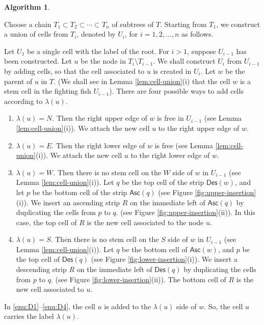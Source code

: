 \documentclass[a4paper,11pt,reqno]{amsart}
\theoremstyle{definition}
\newtheorem{algo}{Algorithm}
\renewcommand{\thealgo}{\Alph{algo}}
\numberwithin{equation}{section}
\newcommand{\Des}{{\textsf{Des}}}
\newcommand{\Asc}{{\textsf{Asc}}}
\begin{document}
\begin{algo} \label{algo:tree-to-fish}
\leavevmode

Choose a chain $T_1\subset T_2\subset\cdots\subset T_n$ of subtrees of $T$. Starting from $T_1$, we construct a union of cells from  $T_i$, denoted by $U_i$,  for $i=1,2,\dots,n$ as follows.

Let $U_1$ be a single cell with the label of the root. For $i>1$, suppose $U_{i-1}$ has been constructed. Let $u$ be the node in $T_i\setminus T_{i-1}$. We shall construct $U_i$ from $U_{i-1}$ by adding cells, so that the cell associated to $u$ is created in $U_i$. Let $w$ be the parent of $u$ in $T$. (We shall see in Lemma \ref{lem:cell-union}(i) that the cell $w$ is a stem cell in the fighting fish $U_{i-1}$). There are four possible ways to add cells according to $\lambda(u)$.


\begin{enumerate}[label=(\thealgo\arabic*), ref=(\thealgo\arabic*)]
\item $\lambda(u)=N$. Then the right upper edge of $w$ is free in $U_{i-1}$ (see Lemma \ref{lem:cell-union}(i)). We attach the new cell $u$ to the right upper edge of $w$. \label{enu:D1}
\item $\lambda(u)=E$.  Then the right lower edge of $w$ is free (see Lemma \ref{lem:cell-union}(i)). We attach the new cell $u$ to the right lower edge of $w$. \label{enu:D2}
\item $\lambda(u)=W$.  Then there is no stem cell on the $W$ side of $w$ in $U_{i-1}$ (see Lemma \ref{lem:cell-union}(i)).
Let $q$ be the top cell of the strip $\Des(w)$, and let $p$ be the bottom cell of the strip $\Asc(q)$ (see Figure \ref{fig:upper-insertion}(i)). 
We insert an ascending strip $R$ on the immediate left of $\Asc(q)$ by duplicating the cells from $p$ to $q$. (see Figure \ref{fig:upper-insertion}(ii)). In this case, the top cell of $R$ is the new cell associated to the node $u$. \label{enu:D3}
\item $\lambda(u)=S$.  Then there is no stem cell on the $S$ side of $w$ in $U_{i-1}$ (see Lemma \ref{lem:cell-union}(i)). Let $q$ be the bottom cell of $\Asc(w)$, and $p$ be the top cell of $\Des(q)$ (see Figure \ref{fig:lower-insertion}(i)). \label{enu:D4}
We insert a descending strip $R$ on the immediate left of $\Des(q)$ by duplicating the cells from $p$ to $q$. (see Figure \ref{fig:lower-insertion}(ii)). The bottom cell of $R$ is the new cell associated to $u$.
\end{enumerate}
In \ref{enu:D1}--\ref{enu:D4}, the cell $u$ is added to the $\lambda(u)$ side of $w$. So, the cell $u$ carries the label $\lambda(u)$.
\end{algo}
\end{document}
